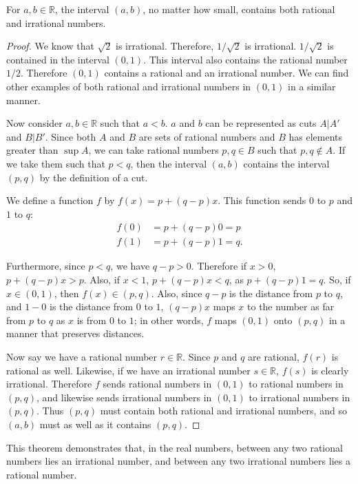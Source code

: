\documentclass[12pt]{article}
\begin{document}
\begin{thm}
  For $a,b \in \mathbb{R}$, the interval $(a,b)$, no matter how small, contains both
  rational and irrational numbers.

  \begin{proof}
    We know that $\sqrt{2}$ is irrational. Therefore, $1/\sqrt{2}$ is irrational.
    $1/\sqrt{2}$ is contained in the interval $(0,1)$. This interval also contains
    the rational number $1/2$. Therefore $(0,1)$ contains a rational and an
    irrational number. We can find other examples of both rational and irrational
    numbers in $(0,1)$ in a similar manner.

    Now consider $a,b \in \mathbb{R}$ such that $a < b$. $a$ and $b$ can be
    represented as cuts $A|A'$ and $B|B'$. Since both $A$ and $B$ are sets of
    rational numbers and $B$ has elements greater than $\sup A$, we can take rational
    numbers $p,q \in B$ such that $p,q \notin A$. If we take them such that $p < q$,
    then the interval $(a,b)$ contains the interval $(p,q)$ by the definition of a cut.

    We define a function $f$ by $f(x) = p + (q - p)x$. This function sends $0$ to $p$
    and $1$ to $q$:
    \begin{align*}
      f(0) &= p + (q - p)0 = p\\
      f(1) &= p + (q - p)1 = q.
    \end{align*}

    Furthermore, since $p < q$, we have $q - p > 0$. Therefore if $x > 0$, $p + (q -
    p)x > p$. Also, if $x < 1$, $p + (q - p)x < q$, as $p + (q - p)1 = q$. So, if $x
    \in (0,1)$, then $f(x) \in (p,q)$. Also, since $q - p$ is the distance from $p$
    to $q$, and $1 - 0$ is the distance from $0$ to $1$, $(q - p)x$ maps $x$ to the
    number as far from $p$ to $q$ as $x$ is from $0$ to $1$; in other words, $f$ maps
    $(0,1)$ onto $(p,q)$ in a manner that preserves distances.

    Now say we have a rational number $r \in \mathbb{R}$. Since $p$ and $q$ are
    rational, $f(r)$ is rational as well. Likewise, if we have an irrational number
    $s \in \mathbb{R}$, $f(s)$ is clearly irrational. Therefore $f$ sends rational
    numbers in $(0,1)$ to rational numbers in $(p,q)$, and likewise sends irrational
    numbers in $(0,1)$ to irrational numbers in $(p,q)$. Thus $(p,q)$ must contain
    both rational and irrational numbers, and so $(a,b)$ must as well as it contains
    $(p,q)$.
  \end{proof}
\end{thm}

\begin{comm}
  This theorem demonstrates that, in the real numbers, between any two rational
  numbers lies an irrational number, and between any two irrational numbers lies a
  rational number.
\end{comm}
\end{document}
